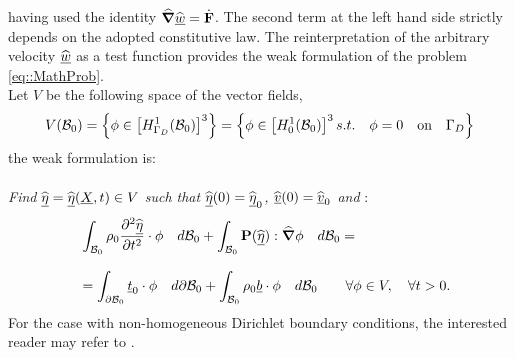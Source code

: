 having used the identity $\widehat{\boldsymbol{\nabla}}\widehat{\underline{w}} = \dot{\textbf{F}}$. The second term at the left hand side strictly depends on the adopted constitutive law. The reinterpretation of the arbitrary velocity $\widehat{\underline{w}}$ as a test function provides the weak formulation of the problem \eqref{eq::MathProb}.\\
Let $V$ be the following space of the vector fields,
\begin{equation}
  V(\mathcal{B}_0)=\left\{\phi\in\left[H_{\Gamma_D}^1(\mathcal{B}_0)\right]^3\right\}=\left\{\phi\in\left[H_{0}^1(\mathcal{B}_0)\right]^3 s.t. \quad \phi=0 \quad\text{on}\quad\Gamma_D\right\}
  \label{eq::TestSpace}
\end{equation}
the weak formulation is:\\
 \\
\textit{Find $\widehat{\underline{\eta}}=\widehat{\underline{\eta}}(\underline{X},t)\in V$ such that $\widehat{\underline{\eta}}(0)=\widehat{\underline{\eta}}_0$, $\widehat{\underline{v}}(0)=\widehat{\underline{v}}_0$ and} :
\begin{equation}
  \begin{array}{lll}
    & \displaystyle \int_{\mathcal{B}_0}\rho_0\frac{\partial^2 \widehat{\underline{\eta}}}{\partial t^2}\cdot\phi\quad d\mathcal{B}_0  + \int_{\mathcal{B}_0}\textbf{P}(\widehat{\underline{\eta}}):\widehat{\boldsymbol{\nabla}}\phi\quad d\mathcal{B}_0 = \\
    \\
    & \displaystyle = \int_{\partial \mathcal{B}_0}\underline{t}_0\cdot\phi\quad d\partial\mathcal{B}_0 + \int_{\mathcal{B}_0}\rho_0 \underline{b}\cdot\phi\quad d\mathcal{B}_0 \qquad \forall \phi\in V, \quad \forall t>0.
    \end{array}
  \label{eq::WF}
\end{equation}
For the case with non-homogeneous Dirichlet boundary conditions, the interested reader may refer to \cite{Hughes}.

